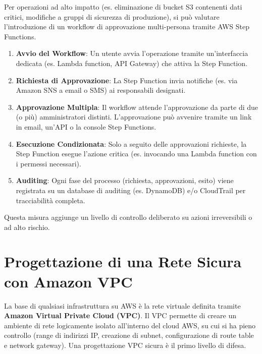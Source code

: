 \documentclass[a4paper,12pt]{report}
\begin{document}
Per operazioni ad alto impatto (es. eliminazione di bucket S3 contenenti dati critici, modifiche a gruppi di sicurezza di produzione), si può valutare l'introduzione di un workflow di approvazione multi-persona tramite AWS Step Functions.
\begin{enumerate}
    \item \textbf{Avvio del Workflow}: Un utente avvia l'operazione tramite un'interfaccia dedicata (es. Lambda function, API Gateway) che attiva la Step Function.
    \item \textbf{Richiesta di Approvazione}: La Step Function invia notifiche (es. via Amazon SNS a email o SMS) ai responsabili designati.
    \item \textbf{Approvazione Multipla}: Il workflow attende l'approvazione da parte di due (o più) amministratori distinti. L'approvazione può avvenire tramite un link in email, un'API o la console Step Functions.
    \item \textbf{Esecuzione Condizionata}: Solo a seguito delle approvazioni richieste, la Step Function esegue l'azione critica (es. invocando una Lambda function con i permessi necessari).
    \item \textbf{Auditing}: Ogni fase del processo (richiesta, approvazioni, esito) viene registrata su un database di auditing (es. DynamoDB) e/o CloudTrail per tracciabilità completa.
\end{enumerate}
Questa misura aggiunge un livello di controllo deliberato su azioni irreversibili o ad alto rischio.


\section{Progettazione di una Rete Sicura con Amazon VPC}
\label{sec:vpc-design}

La base di qualsiasi infrastruttura su AWS è la rete virtuale definita tramite \textbf{Amazon Virtual Private Cloud (VPC)}. Il VPC permette di creare un ambiente di rete logicamente isolato all'interno del cloud AWS, su cui si ha pieno controllo (range di indirizzi IP, creazione di subnet, configurazione di route table e network gateway). Una progettazione VPC sicura è il primo livello di difesa.
\end{document}
